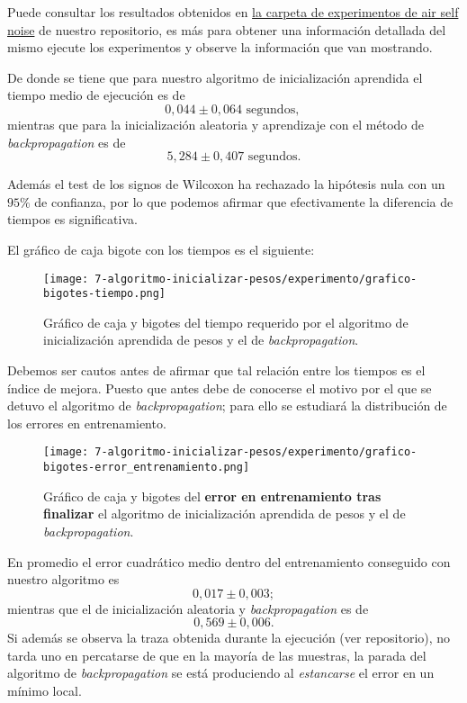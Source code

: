 Puede consultar los resultados obtenidos en 
\href{https://github.com/BlancaCC/TFG-Estudio-de-las-redes-neuronales/tree/main/Experimentos/inicializacion-pesos-red-neuronal/resultados/2_air_self_noise}{la carpeta de experimentos de air self noise} 
de nuestro repositorio, es más para obtener
 una información detallada del mismo ejecute 
 los experimentos y observe la información que van mostrando. 


De donde se tiene que para nuestro algoritmo de inicialización aprendida el tiempo medio de ejecución es de 
\begin{equation}
    0,044 \pm 0,064 \text{ segundos, }
\end{equation}
mientras que para la inicialización aleatoria y aprendizaje con el método de 
\textit{backpropagation} es de 
\begin{equation}
    5,284 \pm 0,407   \text{ segundos}.
\end{equation}

Además el test de los signos de Wilcoxon ha rechazado la hipótesis nula
con un $95\%$ de confianza,
por lo que podemos afirmar que efectivamente la diferencia de tiempos es significativa. 

El gráfico de caja bigote con los tiempos es el siguiente: 

\begin{figure}[H]
    \centering
     \texttt{[image: 7-algoritmo-inicializar-pesos/experimento/grafico-bigotes-tiempo.png]}
     \caption{Gráfico de caja y bigotes del tiempo requerido por el algoritmo de inicialización aprendida de pesos y el de \textit{backpropagation}.}
\end{figure}
Debemos ser cautos antes de afirmar que tal relación entre los tiempos es el índice de mejora. Puesto que antes debe de conocerse el motivo por el que se detuvo el algoritmo de \textit{backpropagation}; para ello se estudiará la distribución de los errores en entrenamiento. 

\begin{figure}[H]
    \centering
     \texttt{[image: 7-algoritmo-inicializar-pesos/experimento/grafico-bigotes-error\_entrenamiento.png]}
     \caption{Gráfico de caja y bigotes del \textbf{error en entrenamiento tras finalizar } el algoritmo de inicialización aprendida de pesos y el de \textit{backpropagation}.}
     \label{img07:error-entrenamiento}
\end{figure}

En promedio el error cuadrático medio dentro del entrenamiento conseguido con nuestro algoritmo es 
\begin{equation}
    0,017 \pm 0,003;
\end{equation}
mientras que el de inicialización aleatoria y \textit{backpropagation} es de 
\begin{equation}
    0,569 \pm 0,006. 
\end{equation}
Si además se observa la traza obtenida durante la ejecución (ver repositorio), 
no tarda uno en percatarse de que en la mayoría de las muestras, la parada del algoritmo de
\textit{backpropagation} se está produciendo al \textit{estancarse} el error 
en un mínimo local. 

